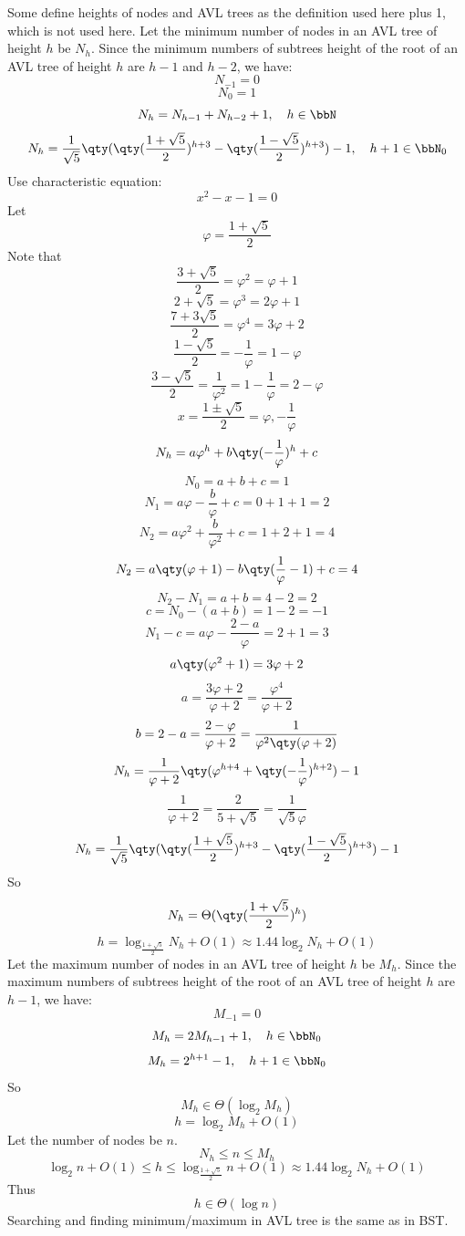 \documentclass[a4paper,12pt]{article}
\begin{document}
Some define heights of nodes and AVL trees as the definition used here plus 1, which is not used here.
Let the minimum number of nodes in an AVL tree of height $h$ be $N_h$. Since the minimum numbers of subtrees height of the root of an AVL tree of height $h$ are $h-1$ and $h-2$, we have:
\[N_{-1}=0\]
\[N_0=1\]
\[N_h=N_{h-1}+N_{h-2}+1,\quad h\in\bbN\]
\[N_h=\frac{1}{\sqrt{5}}\qty(\qty(\frac{1+\sqrt{5}}{2})^{h+3}-\qty(\frac{1-\sqrt{5}}{2})^{h+3})-1,\quad h+1\in\bbN_0\]
\bpr
Use characteristic equation:
\[x^2-x-1=0 \]
Let
\[\varphi=\frac{1+\sqrt{5}}{2}\]
Note that
\[\frac{3+\sqrt{5}}{2}=\varphi^2=\varphi+1\]
\[2+\sqrt{5}=\varphi^3=2\varphi+1\]
\[\frac{7+3\sqrt{5}}{2}=\varphi^4=3\varphi+2\]
\[\frac{1-\sqrt{5}}{2}=-\frac{1}{\varphi}=1-\varphi\]
\[\frac{3-\sqrt{5}}{2}=\frac{1}{\varphi^2}=1-\frac{1}{\varphi}=2-\varphi\]
\[x=\frac{1\pm\sqrt{5}}{2}=\varphi,-\frac{1}{\varphi}\]
\[N_h=a\varphi^h+b\qty(-\frac{1}{\varphi})^h+c\]
\[N_0=a+b+c=1\]
\[N_1=a\varphi-\frac{b}{\varphi}+c=0+1+1=2\]
\[N_2=a\varphi^2+\frac{b}{\varphi^2}+c=1+2+1=4\]
\[N_2=a\qty(\varphi+1)-b\qty(\frac{1}{\varphi}-1)+c=4\]
\[N_2-N_1=a+b=4-2=2\]
\[c=N_0-(a+b)=1-2=-1\]
\[N_1-c=a\varphi-\frac{2-a}{\varphi}=2+1=3\]
\[a\qty(\varphi^2+1)=3\varphi+2\]
\[a=\frac{3\varphi+2}{\varphi+2}=\frac{\varphi^4}{\varphi+2}\]
\[b=2-a=\frac{2-\varphi}{\varphi+2}=\frac{1}{\varphi^2\qty(\varphi+2)}\]
\[N_h=\frac{1}{\varphi+2}\qty(\varphi^{h+4}+\qty(-\frac{1}{\varphi})^{h+2})-1\]
\[\frac{1}{\varphi+2}=\frac{2}{5+\sqrt{5}}=\frac{1}{\sqrt{5}\varphi}\]
\[N_h=\frac{1}{\sqrt{5}}\qty(\qty(\frac{1+\sqrt{5}}{2})^{h+3}-\qty(\frac{1-\sqrt{5}}{2})^{h+3})-1\]
\epr
So
\[N_h=\Theta(\qty(\frac{1+\sqrt{5}}{2})^h)\]
\[h=\log_{\frac{1+\sqrt{5}}{2}}N_h+O(1)\approx 1.44\log_2N_h+O(1)\]
Let the maximum number of nodes in an AVL tree of height $h$ be $M_h$. Since the maximum numbers of subtrees height of the root of an AVL tree of height $h$ are $h-1$, we have:
\[M_{-1}=0\]
\[M_h=2M_{h-1}+1,\quad h\in\bbN_0\]
\[M_h=2^{h+1}-1,\quad h+1\in\bbN_0\]
So
\[M_h\in\Theta(\log_2M_h)\]
\[h=\log_2M_h+O(1)\]
Let the number of nodes be $n$.
\[N_h\le n\le M_h\]
\[\log_2n+O(1)\le h\le\log_{\frac{1+\sqrt{5}}{2}}n+O(1)\approx 1.44\log_2N_h+O(1)\]
Thus
\[h\in\Theta(\log n)\]
Searching and finding minimum/maximum in AVL tree is the same as in BST.
\end{document}
